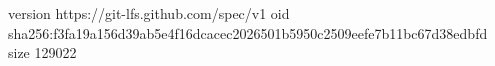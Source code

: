 version https://git-lfs.github.com/spec/v1
oid sha256:f3fa19a156d39ab5e4f16dcacec2026501b5950c2509eefe7b11bc67d38edbfd
size 129022
